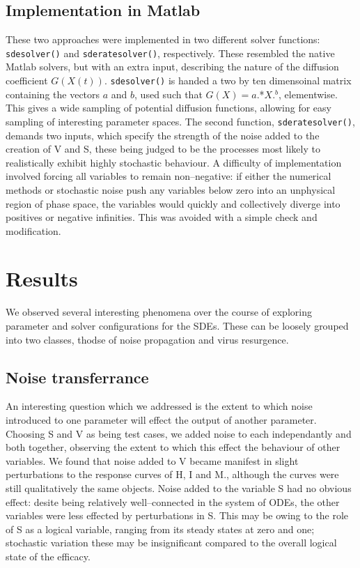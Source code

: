 \documentclass[a4paper, 12pt]{report}
\begin{document}
\subsection{Implementation in Matlab}

These two approaches were implemented in two different solver functions: \texttt{sdesolver()} and \texttt{sderatesolver()}, respectively. These resembled the native Matlab solvers, but with an extra input, describing the nature of the diffusion coefficient $G(X(t))$. \texttt{sdesolver()} is handed a two by ten dimensoinal matrix containing the vectors $a$ and $b$, used such that $G(X)=a.$*$X.^b$, elementwise. This gives a wide sampling of potential diffusion functions, allowing for easy sampling of interesting parameter spaces. The second function, \texttt{sderatesolver()}, demands two inputs, which specify the strength of the noise added to the creation of V and S, these being judged to be the processes most likely to realistically exhibit highly stochastic behaviour. A difficulty of implementation involved forcing all variables to remain non--negative: if either the numerical methods or stochastic noise push any variables below zero into an unphysical region of phase space, the variables would quickly and collectively diverge into positives or negative infinities. This was avoided with a simple check and modification.

\section{Results}

We observed several interesting phenomena over the course of exploring parameter and solver configurations for the SDEs. These can be loosely grouped into two classes, thodse of noise propagation and virus resurgence.

\subsection{Noise transferrance}

An interesting question which we addressed is the extent to which noise introduced to one parameter will effect the output of another parameter. Choosing S and V as being test cases, we added noise to each independantly and both together, observing the extent to which this effect the behaviour of other variables. We found that noise added to V became manifest in slight perturbations to the response curves of H, I and M., although the curves were still qualitatively the same objects. Noise added to the variable S had no obvious effect: desite being relatively well--connected in the system of ODEs, the other variables were less effected by perturbations in S. This may be owing to the role of S as a logical variable, ranging from its steady states at zero and one; stochastic variation these may be insignificant compared to the overall logical state of the efficacy.
\end{document}
